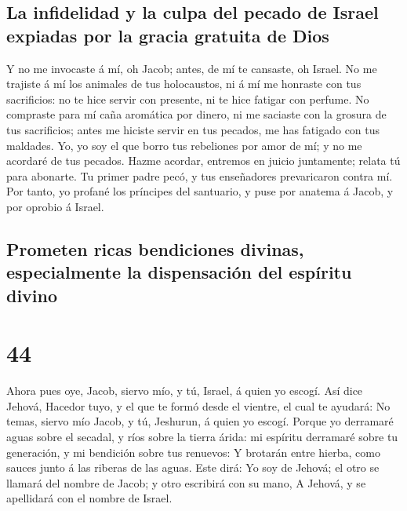 \hypertarget{la-infidelidad-y-la-culpa-del-pecado-de-israel-expiadas-por-la-gracia-gratuita-de-dios}{%
\subsection{La infidelidad y la culpa del pecado de Israel expiadas por
la gracia gratuita de
Dios}\label{la-infidelidad-y-la-culpa-del-pecado-de-israel-expiadas-por-la-gracia-gratuita-de-dios}}

 Y no me invocaste á mí, oh Jacob; antes, de mí te
cansaste, oh Israel.  No me trajiste á mí los animales de
tus holocaustos, ni á mí me honraste con tus sacrificios: no te hice
servir con presente, ni te hice fatigar con perfume.  No
compraste para mí caña aromática por dinero, ni me saciaste con la
grosura de tus sacrificios; antes me hiciste servir en tus pecados, me
has fatigado con tus maldades.  Yo, yo soy el que borro
tus rebeliones por amor de mí; y no me acordaré de tus pecados.
 Hazme acordar, entremos en juicio juntamente; relata tú
para abonarte.  Tu primer padre pecó, y tus enseñadores
prevaricaron contra mí.  Por tanto, yo profané los
príncipes del santuario, y puse por anatema á Jacob, y por oprobio á
Israel.

\hypertarget{prometen-ricas-bendiciones-divinas-especialmente-la-dispensaciuxf3n-del-espuxedritu-divino}{%
\subsection{Prometen ricas bendiciones divinas, especialmente la
dispensación del espíritu
divino}\label{prometen-ricas-bendiciones-divinas-especialmente-la-dispensaciuxf3n-del-espuxedritu-divino}}

\hypertarget{section-23-44}{%
\section{44}\label{section-23-44}}

 Ahora pues oye, Jacob, siervo mío, y tú, Israel, á quien
yo escogí.  Así dice Jehová, Hacedor tuyo, y el que te
formó desde el vientre, el cual te ayudará: No temas, siervo mío Jacob,
y tú, Jeshurun, á quien yo escogí.  Porque yo derramaré
aguas sobre el secadal, y ríos sobre la tierra árida: mi espíritu
derramaré sobre tu generación, y mi bendición sobre tus renuevos:
 Y brotarán entre hierba, como sauces junto á las riberas
de las aguas.  Este dirá: Yo soy de Jehová; el otro se
llamará del nombre de Jacob; y otro escribirá con su mano, A Jehová, y
se apellidará con el nombre de Israel.

